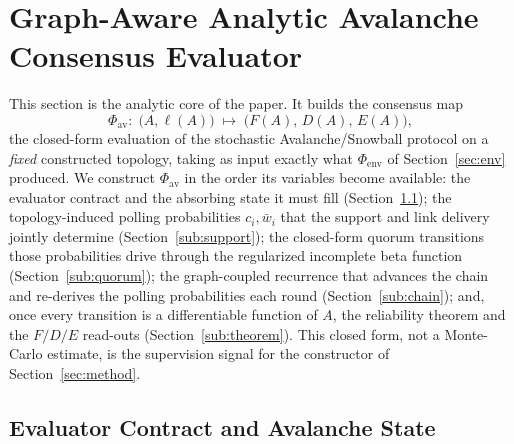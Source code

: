 \documentclass[journal]{IEEEtran}
\begin{document}
\section{Graph-Aware Analytic Avalanche Consensus Evaluator}\label{sec:eval}

This section is the analytic core of the paper. It builds the consensus map
\begin{equation}
  \Phi_{\mathrm{av}}:\;\big(A,\boldsymbol{\ell}(A)\big)\;\longmapsto\;\big(F(A),\,D(A),\,E(A)\big),
  \label{eq:phiav}
\end{equation}
the closed-form evaluation of the stochastic Avalanche/Snowball protocol on a
\emph{fixed} constructed topology, taking as input exactly what
$\Phi_{\mathrm{env}}$ of Section~\ref{sec:env} produced. We construct
$\Phi_{\mathrm{av}}$ in the order its variables become available: the evaluator
contract and the absorbing state it must fill (Section~\ref{sub:proto}); the
topology-induced polling probabilities $c_i,\bar w_i$ that the support and link
delivery jointly determine (Section~\ref{sub:support}); the closed-form quorum
transitions those probabilities drive through the regularized incomplete beta
function (Section~\ref{sub:quorum}); the graph-coupled recurrence that advances
the chain and re-derives the polling probabilities each round
(Section~\ref{sub:chain}); and, once every transition is a differentiable
function of $A$, the reliability theorem and the $F/D/E$ read-outs
(Section~\ref{sub:theorem}). This closed form, not a Monte-Carlo estimate, is the
supervision signal for the constructor of Section~\ref{sec:method}.

\subsection{Evaluator Contract and Avalanche State}\label{sub:proto}
\end{document}
